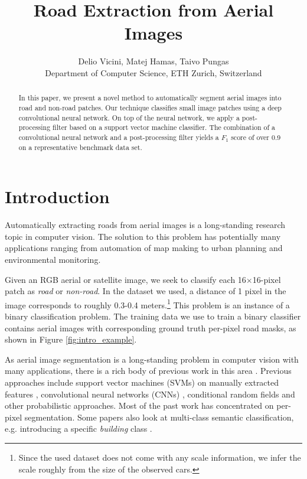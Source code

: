 \documentclass[10pt,conference,compsocconf]{IEEEtran}
\begin{document}
\title{Road Extraction from Aerial Images}
\author{
  Delio Vicini, Matej Hamas, Taivo Pungas\\
  Department of Computer Science, ETH Zurich, Switzerland
}

\maketitle

\begin{abstract}
In this paper, we present a novel method to automatically segment aerial images into road and non-road patches. Our technique classifies small image patches using a deep convolutional neural network. On top of the neural network, we apply a post-processing filter based on a support vector machine classifier. The combination of a convolutional neural network and a post-processing filter yields a $F_1 $ score of over 0.9 on a representative benchmark data set.
\end{abstract}

\section{Introduction}
\label{sec:intro}

Automatically extracting roads from aerial images is a long-standing research topic in computer vision. The solution to this problem has potentially many applications ranging from automation of map making to urban planning and environmental monitoring.

Given an RGB aerial or satellite image, we seek to classify each 16$\times$16-pixel patch as \textit{road} or \textit{non-road}. In the dataset we used, a distance of 1 pixel in the image corresponds to roughly 0.3-0.4 meters.\footnote{Since the used dataset does not come with any scale information, we infer the scale roughly from the size of the observed cars.} This problem is an instance of a binary classification problem. The training data we use to train a binary classifier contains aerial images with corresponding ground truth per-pixel road masks, as shown in Figure \ref{fig:intro_example}.

\par
As aerial image segmentation is a long-standing problem in computer vision with many applications, there is a rich body of previous work in this area \cite{Huang.2002, MnihThesis.2013, Long.2014, Montoya.2015, Saito.2015}. Previous approaches include support vector machines (SVMs) on manually extracted features \cite{Huang.2002}, convolutional neural networks (CNNs) \cite{Long.2014, Saito.2015}, conditional random fields \cite{Montoya.2015} and other probabilistic approaches. Most of the past work has concentrated on per-pixel segmentation. Some papers also look at multi-class semantic classification, e.g. introducing a specific \textit{building} class \cite{Saito.2015}.
\end{document}
